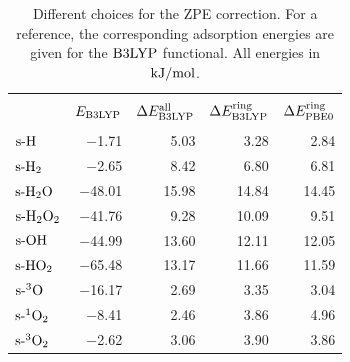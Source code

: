 \documentclass[8.5pt,twoside,twocolumn]{article}
\newcommand\zpe{\enmat{\te{ZPE}}}
\newcommand\ering{\enmat{E^{\te{ring}}}}
\newcommand\eall{\enmat{E^{\te{all}}}}
\newcommand\zpering{\enmat{\zpe/\te{ring}}}
\newcommand\zpeall{\enmat{\zpe/\te{all}}}
\newcommand\eads{\enmat{E^{\te{ads}}}}
\newcommand\sur{\enmat{\te{s-}}}
\newcommand\tripo{\enmat{{^3\te{O}}}}
\newcommand\singot{\enmat{{^1\ot}}}
\newcommand\tripot{\enmat{{^3\ot}}}
\newcommand\kmo{\enmat{\te {kJ/mol}}}
\theoremstyle{standard}
\begin{document}
\renewcommand\eads[1]{E_{\sur\te X}^{\te{ads}{#1}}}
\begin{table}[htb]
  \caption{Different choices for the ZPE correction. For a reference, the corresponding 
  adsorption energies are given for the $\text{B3LYP}$ functional. All energies in $\kmo$.}
  \centering
    \begin{tabular}{l|rrrr}
       & & & & \\[-10pt]
     & $E_{\text{B3LYP}}$   & $\Dl\eall_{\btlyp}$ & $\Dl\ering_{\btlyp}$ & $\Dl\ering_{\pbez}$ \\[2pt]
    \hline
       & & & & \\[-10pt]
    $\sur\te{H}$ & $-$1.71 & 5.03  & 3.28  & 2.84 \\
    $\sur\htw$ & $-$2.65 & 8.42  & 6.80  & 6.81 \\
    $\sur\hto$ & $-$48.01 & 15.98 & 14.84 & 14.45 \\
    $\sur\htot$ & $-$41.76 & 9.28  & 10.09 & 9.51 \\
    $\sur\ho$ & $-$44.99 & 13.60 & 12.11 & 12.05 \\
    $\sur\hot$ & $-$65.48 & 13.17 & 11.66 & 11.59 \\
    $\sur\tripo$ & $-$16.17 & 2.69  & 3.35  & 3.04 \\
    $\sur\singot$ & $-$8.41 & 2.46  & 3.86  & 4.96 \\
    $\sur\tripot$ & $-$2.62 & 3.06  & 3.90  & 3.86 \\[2pt]
    \hline
    \end{tabular}%
  \label{Tab:Ads:AdsB3lyp}%
\end{table}%
\end{document}

